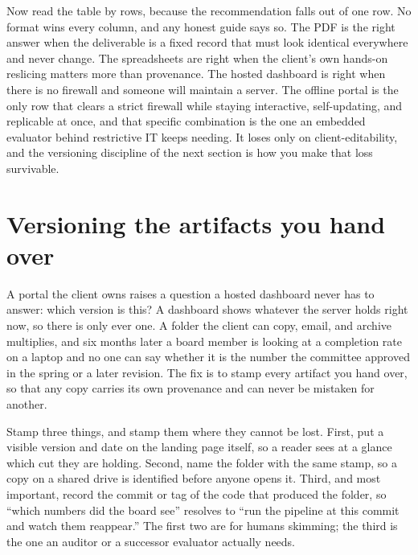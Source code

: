 \documentclass[
    a4paper,
    fontsize=10pt,
    twoside=true,
    numbers=noenddot,
]{kaobook}
\begin{document}
Now read the table by rows, because the recommendation falls out of one row. No format wins every column, and any honest guide says so. The PDF is the right answer when the deliverable is a fixed record that must look identical everywhere and never change. The spreadsheets are right when the client's own hands-on reslicing matters more than provenance. The hosted dashboard is right when there is no firewall and someone will maintain a server. The offline portal is the only row that clears a strict firewall while staying interactive, self-updating, and replicable at once, and that specific combination is the one an embedded evaluator behind restrictive IT keeps needing. It loses only on client-editability, and the versioning discipline of the next section is how you make that loss survivable.

\section{Versioning the artifacts you hand over}\label{sec:versioning}
A portal the client owns raises a question a hosted dashboard never has to answer: which version is this? A dashboard shows whatever the server holds right now, so there is only ever one. A folder the client can copy, email, and archive multiplies, and six months later a board member is looking at a completion rate on a laptop and no one can say whether it is the number the committee approved in the spring or a later revision. The fix is to stamp every artifact you hand over, so that any copy carries its own provenance and can never be mistaken for another.

Stamp three things, and stamp them where they cannot be lost. First, put a visible version and date on the landing page itself, so a reader sees at a glance which cut they are holding. Second, name the folder with the same stamp, so a copy on a shared drive is identified before anyone opens it. Third, and most important, record the commit or tag of the code that produced the folder, so \enquote{which numbers did the board see} resolves to \enquote{run the pipeline at this commit and watch them reappear.} The first two are for humans skimming; the third is the one an auditor or a successor evaluator actually needs.
\end{document}
